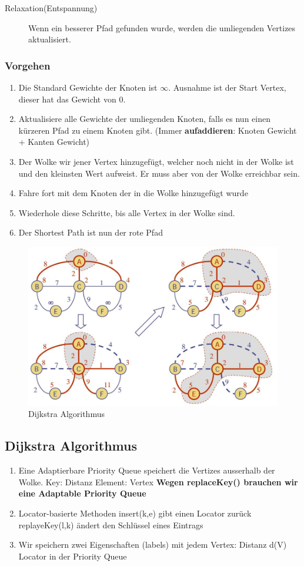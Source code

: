 \begin{description}
	\item[Relaxation(Entspannung)] Wenn ein besserer Pfad gefunden wurde, werden die umliegenden Vertizes aktualisiert.
\end{description}

\subsubsection{Vorgehen}
\begin{enumerate}
	\item Die Standard Gewichte der Knoten ist $\infty$. Ausnahme ist der Start Vertex, dieser hat das Gewicht von 0.
	\item Aktualisiere alle Gewichte der umliegenden Knoten, falls es nun einen kürzeren Pfad zu einem Knoten gibt. (Immer \textbf{aufaddieren}: Knoten Gewicht + Kanten Gewicht)
	\item Der Wolke wir jener Vertex hinzugefügt, welcher noch nicht in der Wolke ist und den kleinsten Wert aufweist. Er muss aber von der Wolke erreichbar sein.
	\item Fahre fort mit dem Knoten der in die Wolke hinzugefügt wurde
	\item Wiederhole diese Schritte, bis alle Vertex in der Wolke sind. 
	\item Der Shortest Path ist nun der rote Pfad
\end{enumerate}

\vfill

\begin{figure}[h]
\centering
\includegraphics[width=0.6\linewidth]{images/dijkstra_algorithm}
\caption{Dijkstra Algorithmus}
\label{fig:dijkstraalgorithm}
\end{figure}
\clearpage

\subsection{Dijkstra Algorithmus}
\begin{enumerate}
	\item Eine Adaptierbare Priority Queue speichert die Vertizes ausserhalb der Wolke. 
		\subitem Key: Distanz
		\subitem Element: Vertex
		\subitem \textbf{Wegen replaceKey() brauchen wir eine Adaptable Priority Queue}
	\item Locator-basierte Methoden
		\subitem insert(k,e) gibt einen Locator zurück
		\subitem replayeKey(l,k) ändert den Schlüssel eines Eintrags
	\item Wir speichern zwei Eigenschaften (labels) mit jedem Vertex:
		\subitem Distanz d(V)
		\subitem Locator in der Priority Queue
\end{enumerate}

